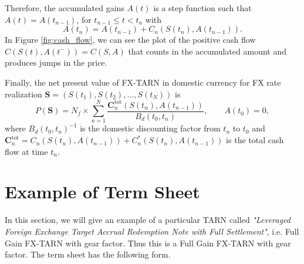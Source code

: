 Therefore, the accumulated gains $A(t)$ is a step function such that $A(t) = A(t_{n-1})$, for $t_{n-1}\leq t < t_n$ with
\[A(t_n)= A(t_{n-1}) + C_n(S(t_n),A(t_{n-1})).\]
In Figure \ref{fig:cash_flow}, we can see the plot of the positive cash flow $C(S(t),A(t^-)) = C(S,A)$ that counts in the accumulated amount and produces jumps in the price.



Finally, the net present value of FX-TARN in domestic currency for FX rate realization $\mathbf{S} = (S(t_1),S(t_2),\ldots,S(t_N))$ is
\begin{equation}\label{eq:intro:pv}
P(\mathbf{S}) =N_f \times \sum_{n=1}^N\frac{\mathbf{C}^\text{tot}_n(S(t_n),A(t_{n-1}))}{B_d(t_0,t_n)}, \qquad A(t_0)=0,
\end{equation}
where $B_d(t_0,t_n)^{-1}$ is the domestic discounting factor from $t_n$ to $t_0$ and $\mathbf{C}^\text{tot}_n = C_n(S(t_n),A(t_{n-1}))+C^\ast_n(S(t_n),A(t_{n-1}))$ is the total cash flow at time $t_n$.

\section{Example of Term Sheet}
\label{sec:intro:term_sheet}
In this section, we will give an example of a particular TARN called \textit{"Leveraged Foreign Exchange Target Accrual Redemption Note with Full Settlement"}, i.e. Full Gain FX-TARN with gear factor. Thus this is a Full Gain FX-TARN with gear factor. The term sheet has the following form.

